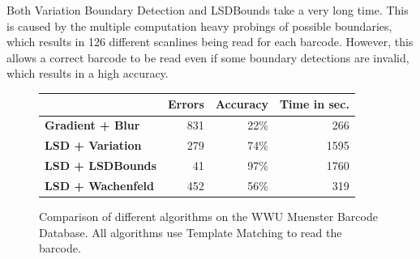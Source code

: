 Both Variation Boundary Detection and LSDBounds take a very long time. This is caused by the multiple computation heavy probings of
possible boundaries, which results in 126 different scanlines being read for
each barcode. However, this allows a correct barcode to be read even if some
boundary detections are invalid, which results in a high accuracy.


\begin{figure}[t]
\center
\bgroup
\def\arraystretch{1.5}
\begin{tabular}{|l|r|r|r|}
\hline
&\textbf{Errors}&\textbf{Accuracy}&\textbf{Time in sec.}\\
\hline
\textbf{Gradient + Blur}& 831& 22\%& 266\\
\hline
\textbf{LSD + Variation}& 279& 74\%& 1595\\
\hline
\textbf{LSD + LSDBounds}& 41& 97\%& 1760\\
\hline
\textbf{LSD + Wachenfeld}& 452& 56\%& 319\\
\hline
\end{tabular}
\egroup
\caption{Comparison of different algorithms on the WWU Muenster Barcode Database. All algorithms use Template Matching to read the barcode.}
\label{laufzeit}
\end{figure}
 
